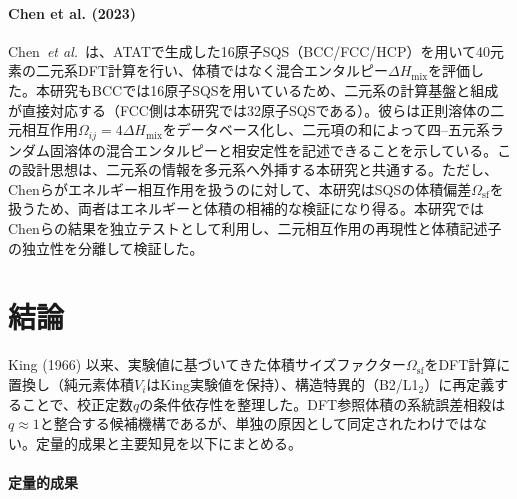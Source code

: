 \documentclass[5p,10pt]{elsarticle}
\begin{document}
\paragraph{Chen et al. (2023)}
Chen~\emph{et al.}~\cite{Chen2023}は、ATATで生成した16原子SQS（BCC/FCC/HCP）を用いて40元素の二元系DFT計算を行い、体積ではなく混合エンタルピー$\Delta H_\text{mix}$を評価した。本研究もBCCでは16原子SQSを用いているため、二元系の計算基盤と組成が直接対応する（FCC側は本研究では32原子SQSである）。彼らは正則溶体の二元相互作用$\Omega_{ij}=4\Delta H_\text{mix}$をデータベース化し、二元項の和によって四--五元系ランダム固溶体の混合エンタルピーと相安定性を記述できることを示している。この設計思想は、二元系の情報を多元系へ外挿する本研究と共通する。ただし、Chenらがエネルギー相互作用を扱うのに対して、本研究はSQSの体積偏差$\Omega_\text{sf}$を扱うため、両者はエネルギーと体積の相補的な検証になり得る。本研究ではChenらの結果を独立テストとして利用し、二元相互作用の再現性と体積記述子の独立性を分離して検証した。


\section{結論}
\label{sec:conclusions}

King (1966) 以来、実験値に基づいてきた体積サイズファクター$\Omega_\text{sf}$をDFT計算に置換し（純元素体積$V_i$はKing実験値を保持）、構造特異的（B2/L1$_2$）に再定義することで、校正定数$q$の条件依存性を整理した。DFT参照体積の系統誤差相殺は$q\approx1$と整合する候補機構であるが、単独の原因として同定されたわけではない。定量的成果と主要知見を以下にまとめる。

\paragraph{定量的成果}
\end{document}
